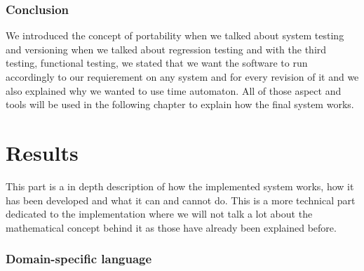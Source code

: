 \documentclass[12pt]{article}
\theoremstyle{definition}
\theoremstyle{definition}
\theoremstyle{remark}
\begin{document}
\clearpage



\section{Conclusion}


We introduced the concept of portability when we talked about system testing and versioning when we talked about regression testing and with the third testing, functional testing, we stated that we want the software to run accordingly to our requierement on any system and for every revision of it and we also explained why we wanted to use time automaton. All of those aspect and tools will be used in the following chapter to explain how the final system works.



\clearpage
\part{Results}

This part is a in depth description of how the implemented system works, how it has been developed and what it can and cannot do. This is a more technical part dedicated to the implementation where we will not talk a lot about the mathematical concept behind it as those have already been explained before.\\

\clearpage




\section{Domain-specific language}
\end{document}
